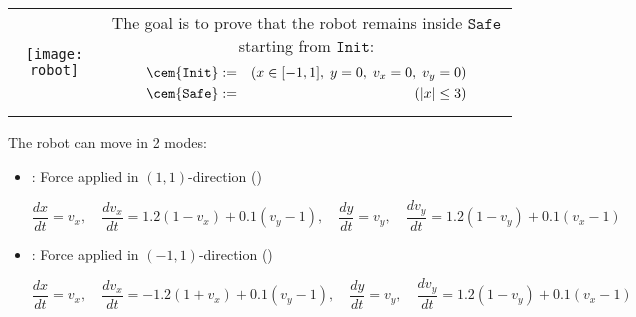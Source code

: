 \documentclass{seminar}
\newcommand\Init{\texttt{Init}}
\newcommand\Safe{\texttt{Safe}}
\begin{document}
\begin{slide}

\begin{tabular}{cc}

\begin{minipage}[c]{0.3\textwidth}
\begin{center}
\texttt{[image: robot]}
\end{center}
\end{minipage}
&
\begin{minipage}[c]{0.65\textwidth}
The goal is to prove that the robot 
remains inside $\Safe$ 
starting from $\Init$:
\begin{eqnarray*}
 {\cem{\Init}} & :=  & (x\in[-1,1], \;y=0, \; v_x = 0,\; v_y = 0)
\\
 {\cem{\Safe}} & := & (|x| \leq 3)
\end{eqnarray*}
\end{minipage}
\end{tabular}

The robot can move in 2 modes:
\begin{itemize}
\item 
{}: Force applied in $(1,1)$-direction ({})
\begin{small}
$$
 \frac{dx}{dt} = v_x, \quad \frac{dv_x}{dt} = 1.2(1 - v_x)+0.1(v_y-1), \quad
 \frac{dy}{dt} = v_y, \quad \frac{dv_y}{dt} = 1.2(1 - v_y)+0.1(v_x-1)
$$
\end{small}
\item
{}: Force applied in $(-1,1)$-direction ({})
\begin{small}
$$
 \frac{dx}{dt} = v_x, \quad \frac{dv_x}{dt} = -1.2(1 + v_x)+0.1(v_y-1), \quad
 \frac{dy}{dt} = v_y, \quad \frac{dv_y}{dt} = 1.2(1 - v_y)+0.1(v_x-1)
$$
\end{small}
\end{itemize}

\end{slide}
\end{document}
